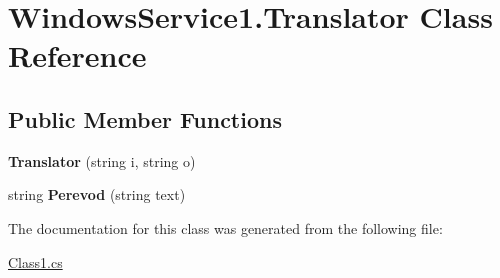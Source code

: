 \hypertarget{class_windows_service1_1_1_translator}{}\section{Windows\+Service1.\+Translator Class Reference}
\label{class_windows_service1_1_1_translator}
\subsection*{Public Member Functions}
\begin{DoxyCompactItemize}
\item 
\hypertarget{class_windows_service1_1_1_translator_a8681ee41bba871f018b8e6183d9f487f}{}\label{class_windows_service1_1_1_translator_a8681ee41bba871f018b8e6183d9f487f} 
{\bfseries Translator} (string i, string o)
\item 
\hypertarget{class_windows_service1_1_1_translator_a1915c8b70d07c0f9fe34f8ebb9ff64ae}{}\label{class_windows_service1_1_1_translator_a1915c8b70d07c0f9fe34f8ebb9ff64ae} 
string {\bfseries Perevod} (string text)
\end{DoxyCompactItemize}


The documentation for this class was generated from the following file\+:\begin{DoxyCompactItemize}
\item 
\hyperlink{_class1_8cs}{Class1.\+cs}\end{DoxyCompactItemize}
